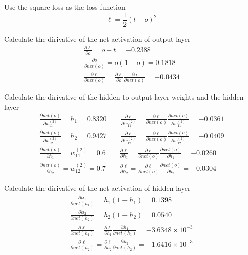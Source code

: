 \documentclass{article}
\begin{document}
Use the square loss as the loss function
\begin{equation*}
\ell = \frac{1}{2} (t - o)^{2}
\end{equation*}

Calculate the dirivative of the net activation of output layer
\begin{gather*}
\frac{\partial \ell}{\partial o} = o - t = -0.2388 \\[3mm]
\frac{\partial o}{\partial net(o)} = o(1 - o) = 0.1818 \\[3mm]
\frac{\partial \ell}{\partial net(o)} = \frac{\partial \ell}{\partial o} 
\frac{\partial o}{\partial net(o)} = -0.0434
\end{gather*}

Calculate the dirivative of the hidden-to-output layer weights and the hidden layer
\begin{gather*}
\frac{\partial net(o)}{\partial w_{11}^{(2)}} = h_{1} = 0.8320 \qquad
\frac{\partial \ell}{\partial w_{11}^{(2)}} = \frac{\partial \ell}{\partial net(o)} 
\frac{\partial net(o)}{\partial w_{11}^{(2)}} = -0.0361\\[3mm]
\frac{\partial net(o)}{\partial w_{12}^{(2)}} = h_{2} = 0.9427 \qquad
\frac{\partial \ell}{\partial w_{12}^{(2)}} = \frac{\partial \ell}{\partial net(o)} 
\frac{\partial net(o)}{\partial w_{12}^{(2)}} = -0.0409 \\[3mm]
\frac{\partial net(o)}{\partial h_{1}} = w_{11}^{(2)} = 0.6 \qquad
\frac{\partial \ell}{\partial h_{1}} = \frac{\partial \ell}{\partial net(o)} 
\frac{\partial net(o)}{\partial h_{1}} = -0.0260 \\[3mm]
\frac{\partial net(o)}{\partial h_{2}} = w_{12}^{(2)} = 0.7 \qquad
\frac{\partial \ell}{\partial h_{2}} = \frac{\partial \ell}{\partial net(o)} 
\frac{\partial net(o)}{\partial h_{2}} = -0.0304
\end{gather*}

Calculate the dirivative of the net activation of hidden layer
\begin{gather*}
\frac{\partial h_{1}}{\partial net(h_{1})} = h_{1}(1 - h_{1}) = 0.1398 \\[3mm]
\frac{\partial h_{2}}{\partial net(h_{2})} = h_{2}(1 - h_{2}) = 0.0540 \\[3mm]
\frac{\partial \ell}{\partial net(h_{1})} = \frac{\partial \ell}{\partial h_{1}} 
\frac{\partial h_{1}}{\partial net(h_{1})} = -3.6348 \times 10^{-3} \\[3mm]
\frac{\partial \ell}{\partial net(h_{2})} = \frac{\partial \ell}{\partial h_{2}} 
\frac{\partial h_{2}}{\partial net(h_{2})} = -1.6416 \times 10^{-3}
\end{gather*}
\end{document}
